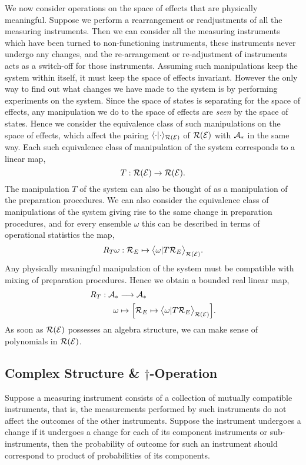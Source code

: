\documentclass[11pt]{article}
\begin{document}
We now consider operations on the space of effects that are physically meaningful. Suppose we perform a rearrangement or readjustments of all the measuring instruments. Then we can consider all the measuring instruments which have been turned to non-functioning instruments, these instruments never undergo any changes, and the re-arrangement or re-adjustment of instruments acts as a switch-off for those instruments. Assuming such manipulations keep the system within itself, it must keep the space of effects invariant. However the only way to find out what changes we have made to the system is by performing experiments on the system. Since the space of states is separating for the space of effects, any manipulation we do to the space of effects are \emph{seen} by the space of states. Hence we consider the equivalence class of such manipulations on the space of effects, which affect the pairing $\langle \cdot| \cdot\rangle_{\mathcal{R}(\mathcal{E})}$ of $\mathcal{R}(\mathcal{E})$ with $\mathcal{A}_* $ in the same way. Each such equivalence class of manipulation of the system corresponds to a linear map,
$$T:\mathcal{R}(\mathcal{E})\to \mathcal{R}(\mathcal{E}).$$
The manipulation $T$ of the system can also be thought of as a manipulation of the preparation procedures. We can also consider the equivalence class of manipulations of the system giving rise to the same change in preparation procedures, and for every ensemble $\omega$ this can be described in terms of operational statistics the map,
$$R_T\omega: \mathcal{R}_E\mapsto\big\langle \omega|T\mathcal{R}_E\big\rangle_{\mathcal{R}(\mathcal{E})}.$$
Any physically meaningful manipulation of the system must be compatible with mixing of preparation procedures. Hence we obtain a bounded real linear map,
\begin{align*}
R_T:\mathcal{A}_*&\longrightarrow \mathcal{A}_*\\
\omega&\mapsto\Big[\mathcal{R}_E\mapsto\big\langle \omega|T\mathcal{R}_E\big\rangle_{\mathcal{R}(\mathcal{E})}\Big].
\end{align*}
As soon as $\mathcal{R}(\mathcal{E})$ possesses an algebra structure, we can make sense of polynomials in $\mathcal{R}(\mathcal{E})$. 

\subsection*{Complex Structure \& $\dagger$-Operation}
Suppose a measuring instrument consists of a collection of mutually compatible instruments, that is, the measurements performed by such instruments do not affect the outcomes of the other instruments. Suppose the instrument undergoes a change if it undergoes a change for each of its component instruments or sub-instruments, then the probability of outcome for such an instrument should correspond to product of probabilities of its components. 
\end{document}
